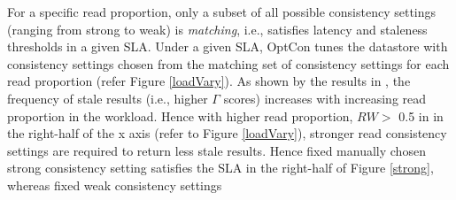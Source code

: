\documentclass{vldb}
\begin{document}
   \par  For a specific read proportion, only
 a subset of all possible consistency settings (ranging from strong to weak) is \emph{matching}, i.e., satisfies latency and
 staleness thresholds in a given SLA.  %
 Under a given SLA, OptCon tunes the datastore with consistency settings chosen from the matching set of consistency settings for each read proportion (refer  Figure \ref{loadVary}).
  As shown by the results in \cite{DBLP:conf/cloud/GolabRAKWG13}, the frequency of stale results (i.e., higher
$\Gamma$ scores) increases with increasing read proportion in the workload.
Hence with higher read proportion, %
 $RW >$ 0.5 in
  in the right-half of the x axis (refer to Figure \ref{loadVary}), stronger read consistency settings are 
  required to return less stale results. Hence fixed manually chosen strong consistency setting 
   satisfies the SLA in the right-half of Figure \ref{strong}, whereas fixed weak consistency settings 
\end{document}
